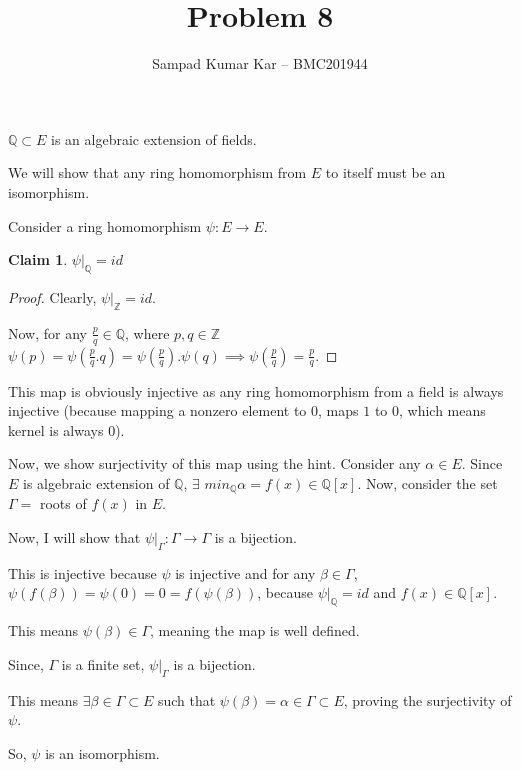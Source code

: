 \documentclass[12pt,a4paper]{article}
\title{Problem 8}
\author{Sampad Kumar Kar -- BMC201944}
\newtheorem{claim}[theorem]{Claim}
\theoremstyle{definition}
\newcommand{\Z}{\mathbb{Z}}
\newcommand{\Q}{\mathbb{Q}}
\begin{document}
\maketitle

\begin{flushleft}

$\Q \subset E$ is an algebraic extension of fields.

We will show that any ring homomorphism from $E$ to itself must be an isomorphism.

\medskip

Consider a ring homomorphism $\psi:E\to E$.

\begin{claim}
	$\psi|_{\Q} = id$
\end{claim}

\begin{proof}
	Clearly, $\psi|_{\Z} = id$.

	Now, for any $\frac{p}{q} \in \Q$, where $p,q \in \Z$ $\psi(p) = \psi(\frac{p}{q}.q) = \psi(\frac{p}{q}).\psi(q) \implies \psi(\frac{p}{q}) = \frac{p}{q}$.
\end{proof}

This map is obviously injective as any ring homomorphism from a field is always injective (because mapping a nonzero element to $0$, maps $1$ to $0$, which means kernel is always $0$).

\medskip

Now, we show surjectivity of this map using the hint. Consider any $\alpha \in E$. Since $E$ is algebraic extension of $\Q$, $\exists$ $min_{\Q} \alpha = f(x) \in \Q[x]$. Now, consider the set $\Gamma =$ roots of $f(x)$ in $E$. 

\medskip

Now, I will show that $\psi|_{\Gamma} : \Gamma \to \Gamma$ is a bijection.

\medskip

This is injective because $\psi$ is injective and for any $\beta \in \Gamma$, $\psi(f(\beta)) = \psi(0) = 0 = f(\psi(\beta))$, because $\psi|_{\Q} = id$ and $f(x) \in \Q[x]$.

This means $\psi(\beta) \in \Gamma$, meaning the map is well defined.

Since, $\Gamma$ is a finite set, $\psi|_{\Gamma}$ is a bijection.

This means $\exists \beta \in \Gamma \subset E$ such that $\psi(\beta) = \alpha \in \Gamma \subset E$, proving the surjectivity of $\psi$.

\medskip

So, $\psi$ is an isomorphism.

\end{flushleft}
\end{document}
